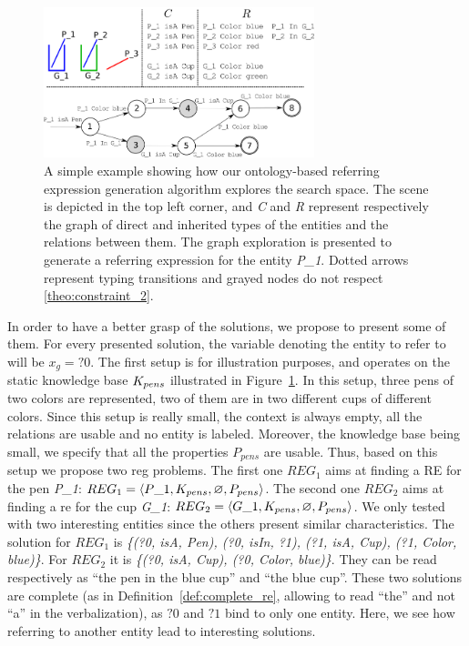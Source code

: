 \documentclass[a4paper,11pt,twoside]{StyleThese}
\begin{document}
\begin{figure}[hbtp]
\centering
\includegraphics[width=0.7\textwidth]{figures/chapter3/search.png}
\caption{A simple example showing how our ontology-based referring expression generation algorithm explores the search space. The scene is depicted in the top left corner, and \textit{C} and \textit{R} represent respectively the graph of direct and inherited types of the entities and the relations between them. The graph exploration is presented to generate a referring expression for the entity \textit{P\_1}. Dotted arrows represent typing transitions and grayed nodes do not respect \ref{theo:constraint_2}.}
\label{fig:search_example} 
\end{figure}

In order to have a better grasp of the solutions, we propose to present some of them. For every presented solution, the variable denoting the entity to refer to will be $x_g = ?0$.
The first setup is for illustration purposes, and operates on the static knowledge base $K_{pens}$ illustrated in Figure~\ref{fig:search_example}. In this setup, three pens of two colors are represented, two of them are in two different cups of different colors.
Since this setup is really small, the context is always empty, all the relations are usable and no entity is labeled. Moreover, the knowledge base being small, we specify that all the properties $P_{pens}$ are usable.
Thus, based on this setup we propose two \acrshort{reg} problems. The first one $REG_1$ aims at finding a RE for the pen \textit{P\_1}: $REG_1 = \langle P\_1, K_{pens}, \varnothing, P_{pens} \rangle$. The second one $REG_2$ aims at finding a \acrshort{re} for the cup \textit{G\_1}: $REG_2 = \langle G\_1, K_{pens}, \varnothing, P_{pens} \rangle$.
We only tested with two interesting entities since the others present similar characteristics.
The solution for $REG_1$ is \textit{\{(?0, isA, Pen), (?0, isIn, ?1), (?1, isA, Cup), (?1, Color, blue)\}}. For $REG_2$ it is \textit{\{(?0, isA, Cup), (?0, Color, blue)\}}. They can be read respectively as ``the pen in the blue cup'' and ``the blue cup''. These two solutions are complete (as in Definition~\ref{def:complete_re}, allowing to read ``the'' and not ``a'' in the verbalization), as $?0$ and $?1$ bind to only one entity. Here, we see how referring to another entity lead to interesting solutions.
\end{document}
